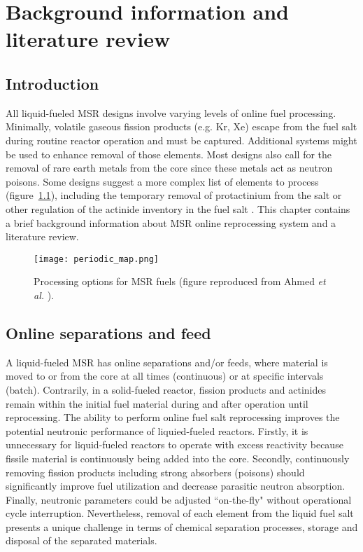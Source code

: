 \chapter[Background information and literature review]{Background information and literature review}

\section{Introduction}
All liquid-fueled \gls{MSR} designs involve varying levels of online fuel processing. Minimally, volatile gaseous fission products (e.g. Kr, Xe) escape from the fuel salt during routine reactor operation and must be captured. Additional systems might be used to enhance removal of those elements. Most designs also call for the removal of rare earth metals from the core since these metals act as neutron poisons. Some designs suggest a more complex list of elements to process (figure~\ref{fig:periodic_tab}), including the temporary removal of protactinium from the salt or other regulation of the actinide inventory in the fuel salt \cite{ahmad_neutronics_2015}. This chapter contains a brief background 
information about \gls{MSR} online reprocessing system and a literature review.
\begin{figure}[htp!] %
  \centering
  \texttt{[image: periodic\_map.png]}
  \caption{Processing options for \gls{MSR} fuels (figure reproduced from 
  Ahmed \emph{et al.} \cite{ahmad_neutronics_2015}).}
  \label{fig:periodic_tab}
\end{figure}

\section{Online separations and feed}
A liquid-fueled \gls{MSR} has online separations and/or feeds, where material 
is moved to or from the core at all times (continuous) or at specific intervals 
(batch). Contrarily, in a solid-fueled reactor, fission products and actinides 
remain within the initial fuel material during and after operation until 
reprocessing. The ability to perform online fuel salt reprocessing improves 
the potential neutronic performance of liquied-fueled reactors. Firstly, it 
is unnecessary for liquid-fueled reactors to operate with excess reactivity 
because fissile material is continuously being added into the core. Secondly, 
continuously removing fission products including strong absorbers (poisons) 
should significantly improve fuel utilization and decrease parasitic 
neutron absorption. Finally, neutronic parameters could be adjusted 
``on-the-fly" without operational cycle interruption. Nevertheless, removal 
of each element from the liquid fuel salt presents a unique challenge in 
terms of chemical separation processes, storage and disposal of the 
separated materials.

